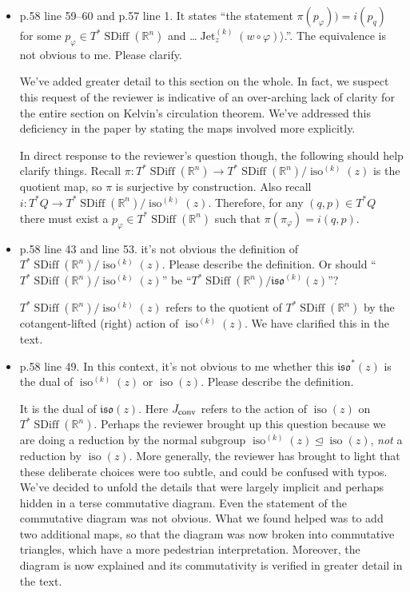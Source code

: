 \documentclass{article}
\def\R{\mathbb{R} }
\def\R{\mathbb{R} }
\DeclareMathOperator{\SDiff}{SDiff}
\DeclareMathOperator{\Jet}{Jet}
\DeclareMathOperator{\iso}{iso}
\begin{document}
\begin{itemize}
\item p.58 line 59--60 and p.57 line 1. It states ``the statement
  $\pi(p_\varphi)) = i(p_q)$ for some $p_\varphi \in T^*\SDiff(\R^n)$
  and \ldots $\Jet_z^{(k)}(w \circ \varphi)\rangle$.''.
  The equivalence is not obvious to me. Please clarify.
  
We've added greater detail to this section on the whole.
In fact, we suspect this request of the reviewer is indicative of an over-arching lack of clarity for the entire section on Kelvin's circulation theorem.
We've addressed this deficiency in the paper by stating the maps involved more explicitly.

In direct response to the reviewer's question though, the following should help clarify things.
Recall $\pi: T^*\SDiff(\R^n) \to T^*\SDiff(\R^n) / \iso^{(k)}(z)$ is the quotient map, so $\pi$ is surjective by construction.
Also recall $i: T^*Q \to T^*\SDiff(\R^n) / \iso^{(k)}(z)$.
Therefore, for any $(q,p) \in T^*Q$ there must exist a $p_\varphi \in T^* \SDiff(\R^n)$ such that $\pi( \pi_\varphi) = i(q,p)$.

\item p.58 line 43 and line 53. it's not obvious the definition of
  $T^*\SDiff(\R^n)/\iso^{(k)}(z)$.
  Please describe the definition. Or should
  ``$T^*\SDiff(\R^n)/\iso^{(k)}(z)$''
  be ``$T^*\SDiff(\R^n)/\mathfrak{iso}^{(k)}(z)$''?

  $T^*\SDiff(\R^n) / \iso^{(k)}(z)$ refers to the quotient of $T^*\SDiff(\R^n)$
  by the cotangent-lifted (right) action of
  $\iso^{(k)}(z)$. We have clarified this in the text.

\item p.58 line 49. In this context, it's not obvious to me whether
  this $\mathfrak{iso}^*(z)$ is the dual of $\iso^{(k)}(z)$ or
  $\iso(z)$. Please describe the definition.

  It is the dual of $\mathfrak{iso}(z)$.
  Here $J_{\rm conv}$ refers to the action of $\iso(z)$ on $T^* \SDiff(\R^n)$.
  Perhaps the reviewer brought up this question because we are doing a reduction by the normal subgroup $\iso^{(k)}(z) \trianglelefteq \iso(z)$, \emph{not} a reduction by $\iso(z)$.
  More generally, the reviewer has brought to light that these deliberate choices were too subtle, and could be confused with typos.
  We've decided to unfold the details that were largely implicit and perhaps hidden in a terse commutative diagram.
  Even the statement of the commutative diagram was not obvious.
  What we found helped was to add two additional maps, so that the diagram was now broken into commutative triangles, which have a more pedestrian interpretation.
  Moreover, the diagram is now explained and its commutativity is verified in greater detail in the text.


\end{itemize}
\end{document}
